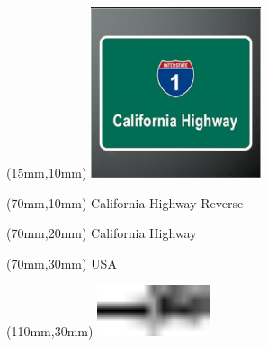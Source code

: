 \null\newpage
\begin{textblock*}{50mm}(15mm,10mm)%
\includegraphics[width=50mm]{LG/2015-05-20_00077.png}
\end{textblock*}
\begin{textblock*}{130mm}(70mm,10mm)%
{\fontsize{20}{20}\selectfont California Highway Reverse}\\
\end{textblock*}
\begin{textblock*}{120mm}(70mm,20mm)%
{\fontsize{16}{16}\selectfont California Highway}\\
\end{textblock*}
\begin{textblock*}{120mm}(70mm,30mm)%
{\fontsize{12}{12}\selectfont USA}
\end{textblock*}
\begin{textblock*}{30mm}(110mm,30mm)%
\centering
\includegraphics[height=15mm]{icons/tofinish.pdf}
\end{textblock*}
